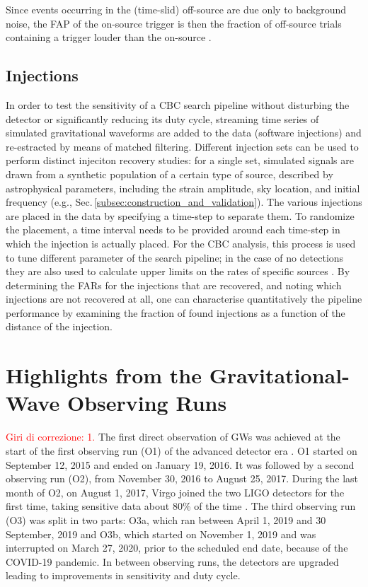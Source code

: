 \documentclass[binding=0.6cm, LaM]{sapthesis}
\newcommand{\fpg}[1]{\textcolor{red}{#1} }
\begin{document}
 	Since events occurring in the (time-slid) off-source are due only to background noise,
	the FAP of the on-source trigger is then the fraction of off-source trials containing a trigger louder than the on-source \cite{46}.

\section{Injections}
\label{sec:injections}
	In order to test the sensitivity of a CBC search pipeline without disturbing the detector or significantly reducing its duty cycle,
        streaming time series of simulated gravitational waveforms are added to the data (software injections)
        and re-estracted by means of matched filtering.
        Different injection sets can be used to perform distinct injeciton recovery studies:
        for a single set, simulated signals are drawn from a synthetic population of a certain type of source,
        described by astrophysical parameters, including the strain amplitude, sky location,
        and initial frequency \cite{30} (e.g., Sec.\,\ref{subsec:construction_and_validation}).
        The various injections are placed in the data by specifying a time-step to separate them.
        To randomize the placement, a time interval needs to be provided around
        each time-step in which the injection is actually placed.
        For the CBC analysis, this process is used to tune different parameter of the search pipeline;
        in the case of no detections they are also used to calculate upper limits on the rates of specific sources \cite{47}.
        By determining the FARs for the injections that are recovered,
        and noting which injections are not recovered at all,
        one can characterise quantitatively the pipeline performance \cite{47, 48}
        by examining the fraction of found injections as a function of the distance of the injection.

	
\chapter{Highlights from the Gravitational-Wave Observing Runs}
\label{ch:ObservingRuns}
\fpg{Giri di correzione: 1.}%
	The first direct observation of GWs was achieved at the start of the first observing run (O1) 
	of the advanced detector era \cite{52}.  
	O1 started on September 12, 2015 and ended on January 19, 2016.  
	It was followed by a second observing run (O2), 
	from November 30, 2016 to August 25, 2017.  
	During the last month of O2, on August 1, 2017, Virgo joined the two LIGO detectors for the first time, 	
	taking sensitive data about 80\% of the time \cite{13}.  
	The third observing run (O3) was split in two parts: O3a, which ran between April 1, 2019 and 30 September, 2019 and O3b, 
	which started on November 1, 2019 and was interrupted on March 27, 2020, prior to the scheduled end date, 
	because of the COVID-19 pandemic.  
	In between observing runs, the detectors are upgraded leading to improvements in sensitivity and duty cycle.
\end{document}
